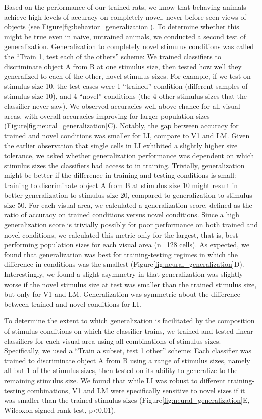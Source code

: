 Based on the performance of our trained rats, we know that behaving animals achieve high levels of accuracy on completely novel, never-before-seen views of objects (see Figure\ref{fig:behavior_generalization}). To determine whether this might be true even in naive, untrained animals, we conducted a second test of generalization. Generalization to completely novel stimulus conditions was called the “Train 1, test each of the others” scheme:  We trained classifiers to discriminate object A from B at one stimulus size, then tested how well they generalized to each of the other, novel stimulus sizes. For example, if we test on stimulus size 10, the test cases were 1 “trained” condition (different samples of stimulus size 10), and 4 “novel” conditions (the 4 other stimulus sizes that the classifier never saw). We observed accuracies well above chance for all visual areas, with overall accuracies improving for larger population sizes (Figure\ref{fig:neural_generalization}C). 
Notably, the gap between accuracy for trained and novel conditions was smaller for LI, compare to V1 and LM. Given the earlier observation that single cells in LI exhibited a slightly higher size tolerance, we asked whether generalization performance was dependent on which stimulus sizes the classifiers had access to in training. Trivially, generalization might be better if the difference in training and testing conditions is small: training to discriminate object A from B at stimulus size 10 might result in better generalization to stimulus size 20, compared to generalization to stimulus size 50. For each visual area, we calculated a generalization score, defined as the ratio of accuracy on trained conditions versus novel conditions. Since a high generalization score is trivially possibly for poor performance on both trained and novel conditions, we calculated this metric only for the largest, that is, best-performing population sizes for each visual area (n=128 cells). As expected, we found that generalization was best for training-testing regimes in which the difference in conditions was the smallest (Figure\ref{fig:neural_generalization}D). Interestingly, we found a slight asymmetry in that generalization was slightly worse if the novel stimulus size at test was smaller than the trained stimulus size, but only for V1 and LM. Generalization was symmetric about the difference between trained and novel conditions for LI.

To determine the extent to which generalization is facilitated by the composition of stimulus conditions on which the classifier trains, we trained and tested linear classifiers for each visual area using all combinations of stimulus sizes. Specifically, we used a ``Train a subset, test 1 other'' scheme:  Each classifier was trained to discriminate object A from B using a range of stimulus sizes, namely all but 1 of the stimulus sizes, then tested on its ability to generalize to the remaining stimulus size. We found that while LI was robust to different training-testing combinations, V1 and LM were specifically sensitive to novel sizes if it was smaller than the trained stimulus sizes (Figure\ref{fig:neural_generalization}E, Wilcoxon signed-rank test, p<0.01). 


